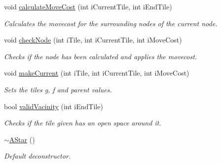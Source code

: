 \begin{DoxyCompactItemize}
void \hyperlink{class_a_star_aef82b1b0f07102dad84ad01697878b5c}{calculate\+Move\+Cost} (int i\+Current\+Tile, int i\+End\+Tile)
\begin{DoxyCompactList}\small\item\em Calculates the movecost for the surrounding nodes of the current node. \end{DoxyCompactList}\item 
void \hyperlink{class_a_star_a6784674ec3b0d4834ef152983df69cd6}{check\+Node} (int i\+Tile, int i\+Current\+Tile, int i\+Move\+Cost)
\begin{DoxyCompactList}\small\item\em Checks if the node has been calculated and applies the movecost. \end{DoxyCompactList}\item 
void \hyperlink{class_a_star_a165bacd432cf39d7f9b154c5552601c9}{make\+Current} (int i\+Tile, int i\+Current\+Tile, int i\+Move\+Cost)
\begin{DoxyCompactList}\small\item\em Sets the tiles g, f and parent values. \end{DoxyCompactList}\item 
bool \hyperlink{class_a_star_a946acaa9502f5499888a765e1aa24280}{valid\+Vacinity} (int i\+End\+Tile)
\begin{DoxyCompactList}\small\item\em Checks if the tile given has an open space around it. \end{DoxyCompactList}\item 
\hyperlink{class_a_star_ad246668465621db8818bbe3511fa4ae7}{$\sim$\+A\+Star} ()
\begin{DoxyCompactList}\small\item\em Default deconstructor. \end{DoxyCompactList}\end{DoxyCompactItemize}
